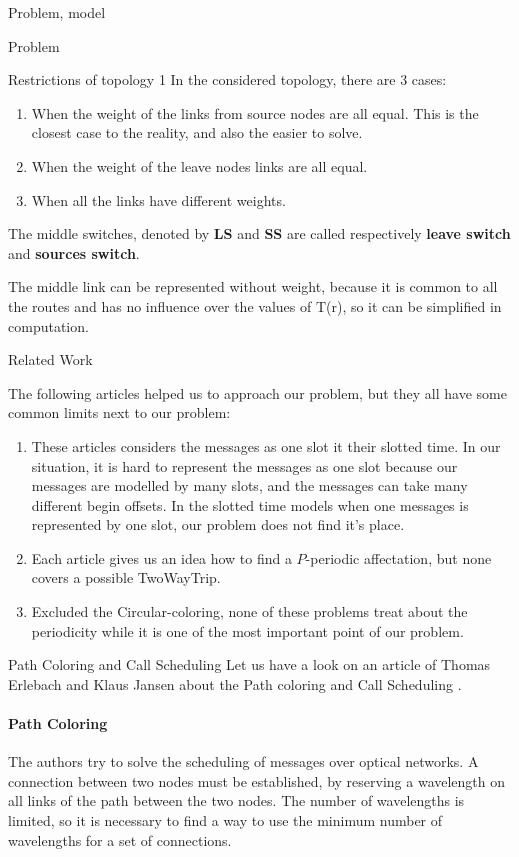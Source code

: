 \documentclass[a4paper,10pt]{report}
\begin{document}
\begin{chapter}{Problem, model}
\begin{section}{Problem}
\begin{subsection}{Restrictions of topology 1}
In the considered topology, there are 3 cases:
\begin{enumerate}
 \item When the weight of the links from source nodes are all equal. This is the closest case to the reality, and also the easier to solve.
 \item When the weight of the leave nodes links are all equal.
 \item When all the links have different weights.
\end{enumerate}

The middle switches, denoted by {\bf LS} and {\bf SS} are called respectively {\bf leave switch} and {\bf sources switch}.

The middle link can be represented without weight, because it is common to all the routes and has no influence over the values of T(r), so it can be simplified in computation. 

\end{subsection}
\end{section}
\begin{section}{Related Work}

The following articles helped us to approach our problem, but they all have some common limits next to our problem:
\begin{enumerate}
 \item These articles considers the messages as one slot it their slotted time. In our situation, it is hard to represent the messages as one slot because our messages are modelled by many slots, and the messages can take many different begin offsets. In the slotted time models when one messages is represented by one slot, our problem does not find it's place.
 \item Each article gives us an idea how to find a $P$-periodic affectation, but none covers a possible TwoWayTrip. 
 \item Excluded the Circular-coloring, none of these problems treat about the periodicity while it is one of the most important point of our problem.
 
\end{enumerate}

\begin{subsection}{Path Coloring and Call Scheduling}
Let us have a look on an article of Thomas Erlebach and Klaus Jansen about the Path coloring and Call Scheduling \cite{erlebach2001complexity}.

\paragraph{Path Coloring}
The authors try to solve the scheduling of messages over optical networks. A connection between two nodes must be established, by reserving a wavelength on all links of the
path between the two nodes. The number of wavelengths is limited, so it is necessary to find a way to use the minimum number of wavelengths for a set 
of connections.


\end{subsection}
\end{section}
\end{chapter}
\end{document}
